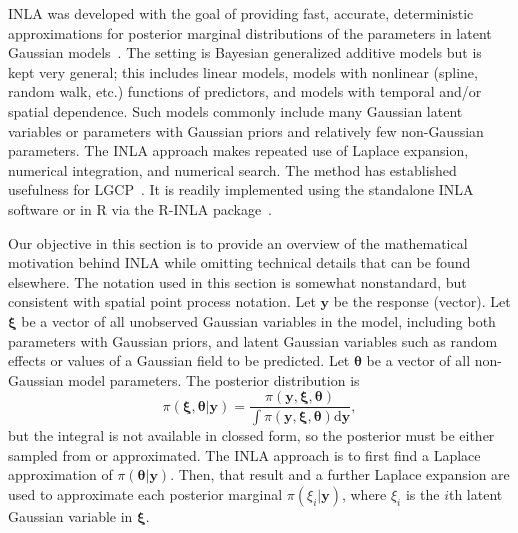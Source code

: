 \documentclass[]{interact}
\begin{document}
INLA was developed with the goal of providing fast, accurate, deterministic
approximations for posterior marginal distributions of the parameters in
latent Gaussian models~\cite{rueetal}. The setting is Bayesian generalized
additive models but is kept very general; this includes linear models, models
with nonlinear (spline, random walk, etc.) functions of predictors, and models
with temporal and/or spatial dependence. Such models commonly include many
Gaussian latent variables or parameters with Gaussian priors and relatively
few non-Gaussian parameters. The INLA approach makes repeated use of Laplace
expansion, numerical integration, and numerical search. The method has
established usefulness for LGCP~\cite{illianetal}. It is readily implemented
using the standalone INLA software or in R via the R-INLA
package~\cite{inlar}.

Our objective in this section is to provide an overview of the mathematical
motivation behind INLA while omitting technical details that can be found
elsewhere. The notation used in this section is somewhat nonstandard, but
consistent with spatial point process notation. Let \(\mathbf{y}\) be the
response (vector). Let \(\boldsymbol{\xi}\) be a vector of all unobserved
Gaussian variables in the model, including both parameters with Gaussian
priors, and latent Gaussian variables such as random effects or values of a
Gaussian field to be predicted. Let \(\boldsymbol{\theta}\) be a vector of all
non-Gaussian model parameters. The posterior distribution is
\begin{displaymath}
\pi\left(\boldsymbol{\xi}, \boldsymbol{\theta}| \mathbf{y}\right)
= \frac{\pi\left(\mathbf{y}, \boldsymbol{\xi}, \boldsymbol{\theta}\right)}
{\int \pi\left(\mathbf{y}, \boldsymbol{\xi}, \boldsymbol{\theta}\right)
\mathrm{d}\mathbf{y}},
\end{displaymath}
but the integral is not available in clossed form, so the posterior must be
either sampled from or approximated. The INLA approach is to first find a
Laplace approximation of \(\pi\left(\boldsymbol{\theta} | \mathbf{y}\right)\).
Then, that result and a further Laplace expansion are used to approximate each
posterior marginal \(\pi\left(\xi_{i}| \mathbf{y}\right)\), where \(\xi_{i}\)
is the \(i\)th latent Gaussian variable in \(\boldsymbol{\xi}\).
\end{document}
